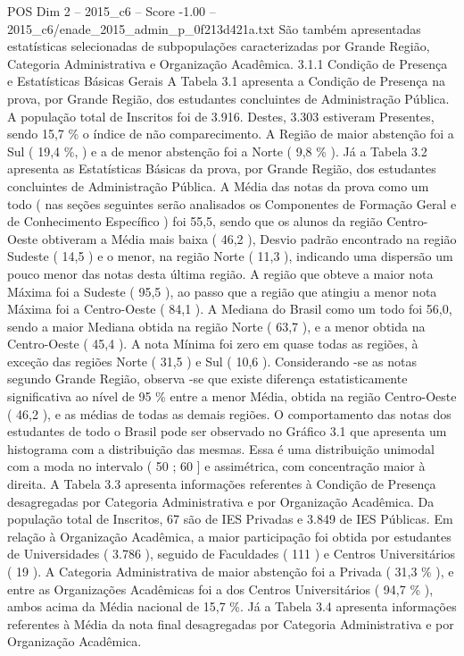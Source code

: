 \begin{textsample}{POS Dim 2 – 2015\_c6 – Score -1.00 – 2015\_c6/enade\_2015\_admin\_p\_0f213d421a.txt}
São também apresentadas estatísticas selecionadas de subpopulações caracterizadas por Grande Região, Categoria Administrativa e Organização Acadêmica. 3.1.1 Condição de Presença e Estatísticas Básicas Gerais A Tabela 3.1 apresenta a Condição de Presença na prova, por Grande Região, dos estudantes concluintes de Administração Pública.
A população total de Inscritos foi de 3.916.
Destes, 3.303 estiveram Presentes, sendo 15,7 \% o índice de não comparecimento.
A Região de maior abstenção foi a Sul ( 19,4 \%, ) e a de menor abstenção foi a Norte ( 9,8 \% ).
Já a Tabela 3.2 apresenta as Estatísticas Básicas da prova, por Grande Região, dos estudantes concluintes de Administração Pública.
A Média das notas da prova como um todo ( nas seções seguintes serão analisados os Componentes de Formação Geral e de Conhecimento Específico ) foi 55,5, sendo que os alunos da região Centro-Oeste obtiveram a Média mais baixa ( 46,2 ), Desvio padrão encontrado na região Sudeste ( 14,5 ) e o menor, na região Norte ( 11,3 ), indicando uma dispersão um pouco menor das notas desta última região.
A região que obteve a maior nota Máxima foi a Sudeste ( 95,5 ), ao passo que a região que atingiu a menor nota Máxima foi a Centro-Oeste ( 84,1 ).
A Mediana do Brasil como um todo foi 56,0, sendo a maior Mediana obtida na região Norte ( 63,7 ), e a menor obtida na Centro-Oeste ( 45,4 ).
A nota Mínima foi zero em quase todas as regiões, à exceção das regiões Norte ( 31,5 ) e Sul ( 10,6 ).
Considerando -se as notas segundo Grande Região, observa -se que existe diferença estatisticamente significativa ao nível de 95 \% entre a menor Média, obtida na região Centro-Oeste ( 46,2 ), e as médias de todas as demais regiões.
O comportamento das notas dos estudantes de todo o Brasil pode ser observado no Gráfico 3.1 que apresenta um histograma com a distribuição das mesmas.
Essa é uma distribuição unimodal com a moda no intervalo ( 50 ; 60 ] e assimétrica, com concentração maior à direita.
A Tabela 3.3 apresenta informações referentes à Condição de Presença desagregadas por Categoria Administrativa e por Organização Acadêmica.
Da população total de Inscritos, 67 são de IES Privadas e 3.849 de IES Públicas.
Em relação à Organização Acadêmica, a maior participação foi obtida por estudantes de Universidades ( 3.786 ), seguido de Faculdades ( 111 ) e Centros Universitários ( 19 ).
A Categoria Administrativa de maior abstenção foi a Privada ( 31,3 \% ), e entre as Organizações Acadêmicas foi a dos Centros Universitários ( 94,7 \% ), ambos acima da Média nacional de 15,7 \%.
Já a Tabela 3.4 apresenta informações referentes à Média da nota final desagregadas por Categoria Administrativa e por Organização Acadêmica.

\end{textsample}
